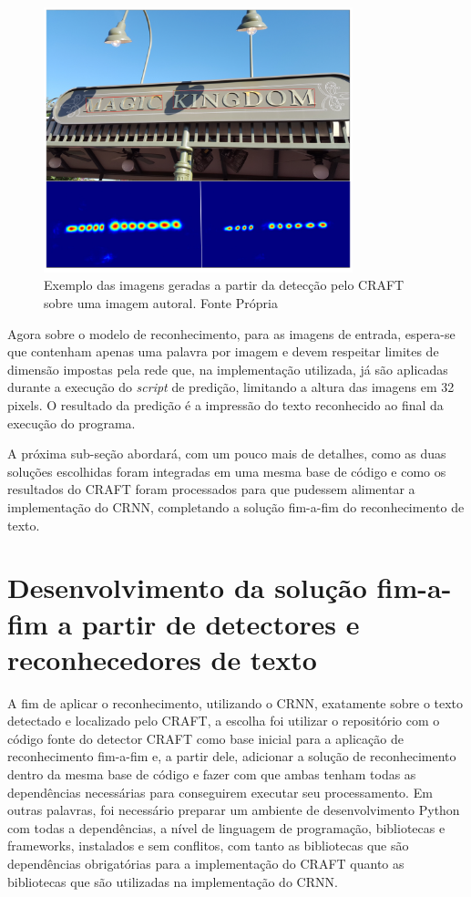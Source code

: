 \begin{figure}
    \centering
    \includegraphics[width=0.8\textwidth]{figs/craft-exmaple.png}
    \caption{Exemplo das imagens geradas a partir da detecção pelo CRAFT sobre uma imagem autoral. Fonte Própria}
    \label{fig:methodology_craft_example}
\end{figure}

Agora sobre o modelo de reconhecimento, para as imagens de entrada, espera-se que contenham apenas uma palavra por imagem e devem respeitar limites de dimensão impostas pela rede que, na implementação utilizada, já são aplicadas durante a execução do \textit{script} de predição, limitando a altura das imagens em 32 pixels. O resultado da predição é a impressão do texto reconhecido ao final da execução do programa. 

A próxima sub-seção abordará, com um pouco mais de detalhes, como as duas soluções escolhidas foram integradas em uma mesma base de código e como os resultados do CRAFT foram processados para que pudessem alimentar a implementação do CRNN, completando a solução fim-a-fim do reconhecimento de texto. 

\section{Desenvolvimento da solução fim-a-fim a partir de detectores e reconhecedores de texto}\label{sec:metodologia_desenvolvimento}

A fim de aplicar o reconhecimento, utilizando o CRNN, exatamente sobre o texto detectado e localizado pelo CRAFT, a escolha foi utilizar o repositório com o código fonte do detector CRAFT como base inicial para a aplicação de reconhecimento fim-a-fim e, a partir dele, adicionar a solução de reconhecimento dentro da mesma base de código e fazer com que ambas tenham todas as dependências necessárias para conseguirem executar seu processamento. Em outras palavras, foi necessário preparar um ambiente de desenvolvimento Python com todas a dependências, a nível de linguagem de programação, bibliotecas e frameworks, instalados e sem conflitos, com tanto as bibliotecas que são dependências obrigatórias para a implementação do CRAFT quanto as bibliotecas que são utilizadas na implementação do CRNN.

